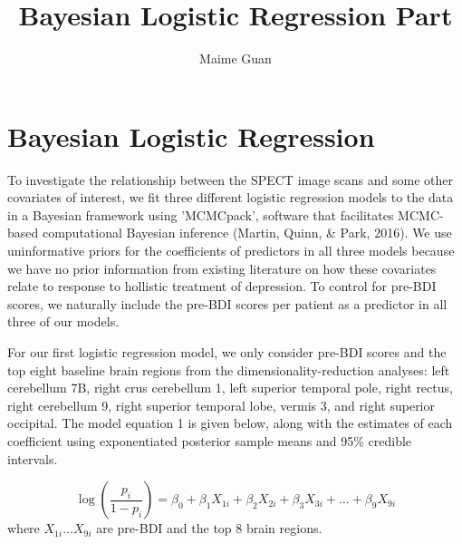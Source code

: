 \documentclass[12pt,doc]{apa}
\title{Bayesian Logistic Regression Part}
\author{Maime Guan}
\begin{document}
\setcounter{page}{0}
\pagestyle{plain}

\maketitle

\section{Bayesian Logistic Regression}

To investigate the relationship between the SPECT image scans and some other covariates of interest, we fit three different logistic regression models to the data in a Bayesian framework using 'MCMCpack', software that facilitates MCMC-based computational Bayesian inference (Martin, Quinn, \& Park, 2016). We use uninformative priors for the coefficients of predictors in all three models because we have no prior information from existing literature on how these covariates relate to response to hollistic treatment of depression. To control for pre-BDI scores, we naturally include the pre-BDI scores per patient as a predictor in all three of our models.

For our first logistic regression model, we only consider pre-BDI scores and the top eight baseline brain regions from the dimensionality-reduction analyses: left cerebellum 7B, right crus cerebellum 1, left superior temporal pole, right rectus, right cerebellum 9, right superior temporal lobe, vermis 3, and right superior occipital. The model equation 1 is given below, along with the estimates of each coefficient using exponentiated posterior sample means and 95\% credible intervals.

\begin{equation}
\log \left( \frac{p_{i}}{1-p_{i}} \right) = \beta_{0} + \beta_{1}X_{1i} + \beta_{2}X_{2i} + \beta_{3}X_{3i} + \ldots + \beta_{9}X_{9i}
\end{equation}
where $X_{1i} \ldots X_{9i}$ are pre-BDI and the top 8 brain regions.
\medskip
\end{document}
